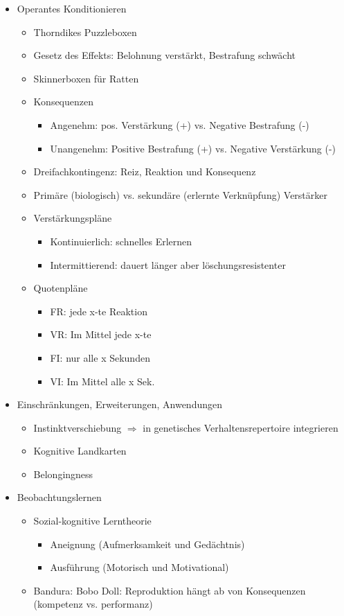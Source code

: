 \documentclass[11pt, paper=a4, twocolumn]{scrartcl}
\begin{document}
\begin{itemize}
		\item Operantes Konditionieren
			\begin{itemize}
				\item Thorndikes Puzzleboxen
				\item Gesetz des Effekts: Belohnung verstärkt, Bestrafung 
					schwächt
				\item Skinnerboxen für Ratten
				\item Konsequenzen
					\begin{itemize}
						\item Angenehm: pos. Verstärkung (+) vs. 
							Negative Bestrafung (-)
						\item Unangenehm: Positive Bestrafung (+) 
							vs. Negative Verstärkung (-)
					\end{itemize}
				\item Dreifachkontingenz: Reiz, Reaktion und Konsequenz
				\item Primäre (biologisch) vs. sekundäre (erlernte 
					Verknüpfung) Verstärker
				\item Verstärkungspläne
					\begin{itemize}
						\item Kontinuierlich: schnelles Erlernen
						\item Intermittierend: dauert länger aber 
							löschungsresistenter	
					\end{itemize}
				\item Quotenpläne
					\begin{itemize}
						\item FR: jede x-te Reaktion
						\item VR: Im Mittel jede x-te
						\item FI: nur alle x Sekunden
						\item VI: Im Mittel alle x Sek.
					\end{itemize}
			\end{itemize}

		\item Einschränkungen, Erweiterungen, Anwendungen
			\begin{itemize}
				\item Instinktverschiebung $\Rightarrow$ in genetisches 
					Verhaltensrepertoire integrieren
				\item Kognitive Landkarten
				\item Belongingness
			\end{itemize}

		\item Beobachtungslernen
			\begin{itemize}
				\item Sozial-kognitive Lerntheorie
					\begin{itemize}
						\item Aneignung (Aufmerksamkeit und 
							Gedächtnis)
						\item Ausführung (Motorisch und 
							Motivational)
					\end{itemize}
				\item Bandura: Bobo Doll: Reproduktion hängt ab von 
					Konsequenzen (kompetenz vs. performanz)
			\end{itemize}

	\end{itemize}
\end{document}
